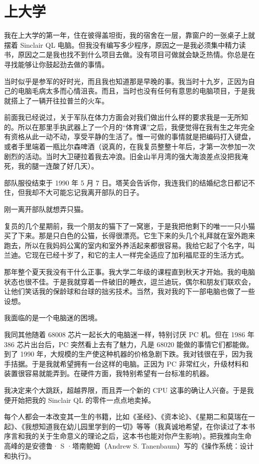  
\section{上大学}

我在上大学的第一年，住在彼得盖坦街，我的宿舍在一层，靠窗户的一张桌子上就摆着 Sinclair QL 电脑。但我没有编写多少程序，原因之一是我必须集中精力读书，原因之二是我也找不到什么项目去做。没有项目可做就会缺乏热情。你总是在寻找能够让你鼓起劲去做的事情。

当时似乎是参军的好时光，而且我也知道那是早晚的事。我当时十九岁，正因为自己的电脑毛病太多而心情沮丧。而且，当时也没有任何有意思的电脑项目，于是我就搭上了一辆开往拉普兰的火车。

前面我已经说过，关于军队在体力方面会对我们做出什么样的要求我是一无所知的。所以在那里手执武器上了一个月的“体育课”之后，我便觉得在我有生之年完全有资格从此一动不动，享受平静的生活了。惟一可做的事情就是把编码打入键盘，或者手里端着一瓶比尔森啤酒（说真的，在我复员整整十年后，才第一次参加一次剧烈的活动。当时大卫硬拉着我去冲浪。旧金山半月湾的强大海浪差点没把我淹死，我的腿一连酸了好几天）。

部队服役结束于 1990 年 5 月 7 日。塔芙会告诉你，我连我们的结婚纪念日都记不住，但我却不大可能忘记我离开部队的日子。

刚一离开部队就想弄只猫。

复员的几个星期前，我一个朋友的猫下了一窝崽，于是我把他剩下的唯一一只小猫买了下来。那是只白色的公猫，长得很漂亮。它生下来的头几个礼拜就在室外跑来跑去，所以在我妈妈公寓的室内和室外养活起来都很容易。我给它起了个名字，叫兰迪。它现在已经十岁了，和它的主人一样完全适应了加利福尼亚的生活方式。

那年整个夏天我没有干什么正事。我大学二年级的课程直到秋天才开始。我的电脑状态也很不佳。于是我就穿着一件破旧的睡衣，逗兰迪玩，偶尔和朋友们联欢会，让他们笑话我的保龄球和台球的拙劣技术。当然，我对我的下一部电脑也做了一些设想。

我面临的是一个电脑迷的困境。

我同其他随着 68008 芯片一起长大的电脑迷一样，特别讨厌 PC 机。但在 1986 年 386 芯片出台后，PC 突然看上去有了魅力，凡是 68020 能做的事情它们都能做。到了 1990 年，大规模的生产使这种机器的价格急剧下跌。我对钱很在乎，因为我手拮据。于是我就希望拥有一台这样的电脑。正因为 PC 非常红火，升级材料和装置很容易就能弄到。在硬件方面，我特别希望有一台标准的机器。

我决定来个大跳跃，超越界限，而且弄一个新的 CPU 这事的确让人兴奋。于是我便开始把我的 Sinclair QL 的零件一点点地卖掉。

每个人都会一本改变其一生的书籍，比如《圣经》、《资本论》、《星期二和莫瑞在一起》、《我想知道我在幼儿园里学到的一切》等等（我真诚地希望，在你读过了本书序言和我的关于生命意义的理论之后，这本书也能对你产生影响）。把我推向生命高峰的是安德鲁· S ·塔南鲍姆（Andrew S. Tanenbaum）写的《操作系统：设计和执行》。

